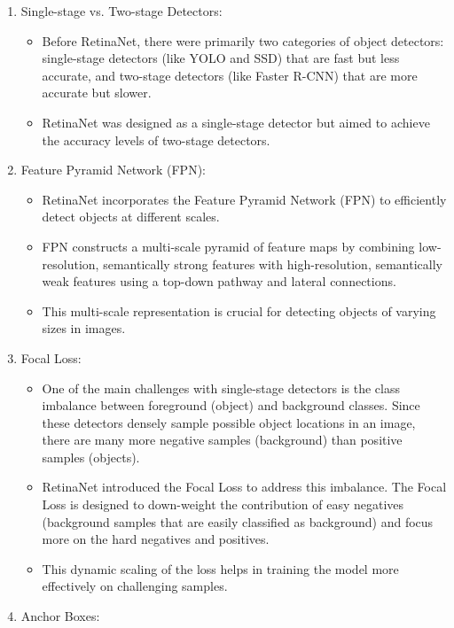 \documentclass{article}
\begin{document}
\begin{enumerate}
  \item Single-stage vs. Two-stage Detectors:
  \begin{itemize}
    \item Before RetinaNet, there were primarily two categories of object detectors: single-stage detectors (like YOLO and SSD) that are fast but less accurate, and two-stage detectors (like Faster R-CNN) that are more accurate but slower.

    \item RetinaNet was designed as a single-stage detector but aimed to achieve the accuracy levels of two-stage detectors.
  \end{itemize}
  \item Feature Pyramid Network (FPN):

  \begin{itemize}
    \item RetinaNet incorporates the Feature Pyramid Network (FPN) to efficiently detect objects at different scales.
    \item FPN constructs a multi-scale pyramid of feature maps by combining low-resolution, semantically strong features with high-resolution, semantically weak features using a top-down pathway and lateral connections.
    \item This multi-scale representation is crucial for detecting objects of varying sizes in images.
  \end{itemize}
  \item Focal Loss:
  \begin{itemize}
  \item One of the main challenges with single-stage detectors is the class imbalance between foreground (object) and background classes. Since these detectors densely sample possible object locations in an image, there are many more negative samples (background) than positive samples (objects).
  \item RetinaNet introduced the Focal Loss to address this imbalance. The Focal Loss is designed to down-weight the contribution of easy negatives (background samples that are easily classified as background) and focus more on the hard negatives and positives.
  \item This dynamic scaling of the loss helps in training the model more effectively on challenging samples.
\end{itemize}
  \item Anchor Boxes:
  \begin{itemize}

\end{itemize}
\end{enumerate}
\end{document}
